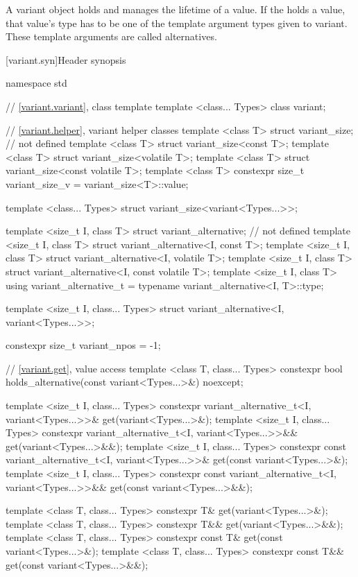 \pnum
A variant object holds and manages the lifetime of a value.
If the  holds a value, that value's type has to be one
of the template argument types given to variant.
These template arguments are called alternatives.

[variant.syn]{Header  synopsis}
%
%

\begin{codeblock}
namespace std {
  // \ref{variant.variant}, class template 
  template <class... Types>
    class variant;

  // \ref{variant.helper}, variant helper classes
  template <class T> struct variant_size;                   // not defined
  template <class T> struct variant_size<const T>;
  template <class T> struct variant_size<volatile T>;
  template <class T> struct variant_size<const volatile T>;
  template <class T>
    constexpr size_t variant_size_v = variant_size<T>::value;

  template <class... Types>
    struct variant_size<variant<Types...>>;

  template <size_t I, class T> struct variant_alternative;  // not defined
  template <size_t I, class T> struct variant_alternative<I, const T>;
  template <size_t I, class T> struct variant_alternative<I, volatile T>;
  template <size_t I, class T> struct variant_alternative<I, const volatile T>;
  template <size_t I, class T>
    using variant_alternative_t = typename variant_alternative<I, T>::type;

  template <size_t I, class... Types>
    struct variant_alternative<I, variant<Types...>>;

  constexpr size_t variant_npos = -1;

  // \ref{variant.get}, value access
  template <class T, class... Types>
    constexpr bool holds_alternative(const variant<Types...>&) noexcept;

  template <size_t I, class... Types>
    constexpr variant_alternative_t<I, variant<Types...>>& get(variant<Types...>&);
  template <size_t I, class... Types>
    constexpr variant_alternative_t<I, variant<Types...>>&& get(variant<Types...>&&);
  template <size_t I, class... Types>
    constexpr const variant_alternative_t<I, variant<Types...>>& get(const variant<Types...>&);
  template <size_t I, class... Types>
    constexpr const variant_alternative_t<I, variant<Types...>>&& get(const variant<Types...>&&);

  template <class T, class... Types>
    constexpr T& get(variant<Types...>&);
  template <class T, class... Types>
    constexpr T&& get(variant<Types...>&&);
  template <class T, class... Types>
    constexpr const T& get(const variant<Types...>&);
  template <class T, class... Types>
    constexpr const T&& get(const variant<Types...>&&);

}
\end{codeblock}
